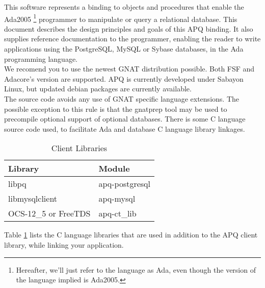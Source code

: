 \documentclass[english,letterpaper]{book}
\begin{document}
This software represents a binding to objects and procedures that
enable the Ada2005%
\footnote{Hereafter, we'll just refer to the language as Ada, even though the
version of the language implied is Ada2005.%
} programmer to manipulate or query a relational database. This document
describes the design principles and goals of this APQ binding. It
also supplies reference documentation to the programmer, enabling
the reader to write applications using the PostgreSQL, MySQL 
or Sybase  databases,
in the Ada programming language.\\

We recomend you to use the newest GNAT distribution possible. Both FSF and Adacore's version are supported.
APQ is currently developed under Sabayon Linux, but updated debian packages are currently available.\\

The source code avoids any use of GNAT specific language extensions.
The possible exception to this rule is that the gnatprep tool may
be used to precompile optional support of optional databases. There
is some C language source code used, to facilitate Ada and database
C language library linkages.

\begin{table}
   \begin{center}
   \begin{tabular}{ll}
   Library              &  Module         \\
   \hline 
   libpq                &  apq-postgresql \\
   libmysqlclient       &  apq-mysql      \\
   OCS-12\_5 or FreeTDS &  apq-ct\_lib    \\
   \end{tabular}
   \end{center}
\caption{Client Libraries}\label{t:ClientLib}
\end{table}

Table \ref{t:ClientLib} 
lists the C language libraries that are
used in addition to the APQ client library, while linking your
application.\\
\end{document}
